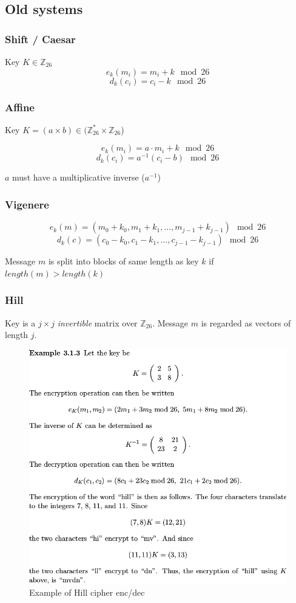 \subsection{Old systems}
\subsubsection{Shift / Caesar}
Key $K \in \mathbb{Z}_{26}$
\[ e_k(m_i) =  m_i + k \mod 26 \]
\[ d_k(c_i) = c_i - k \mod 26 \]

\subsubsection{Affine}
Key $K = (a \times b) \in (\mathbb{Z}_{26}^* \times \mathbb{Z}_{26}$)

\[ e_k(m_i) = a \cdot m_i + k \mod 26 \]
\[ d_k(c_i) = a^{-1}(c_i - b) \mod 26 \]

$a$ must have a multiplicative inverse ($a^{-1}$)

\subsubsection{Vigenere}
\[ e_k (m) = (m_0 + k_0, m_1 + k_1, \ldots, m_{j-1} + k_{j-1} ) \mod 26 \]
\[ d_k (c) = (c_0 - k_0 , c_1 - k_1 , \ldots, c_{j-1} - k_{j-1} ) \mod 26 \]

Message $m$ is split into blocks of same length as key $k$ if $length(m) > length(k)$

\subsubsection{Hill}
Key is a $j \times j$ \emph{invertible} matrix over $\mathbb{Z}_{26}$. Message $m$ is regarded as vectors of length $j$.

\begin{figure}[H]
\centering
\includegraphics[scale=0.3]{images/1-hill.png}
\caption{Example of Hill cipher enc/dec}
\end{figure}
